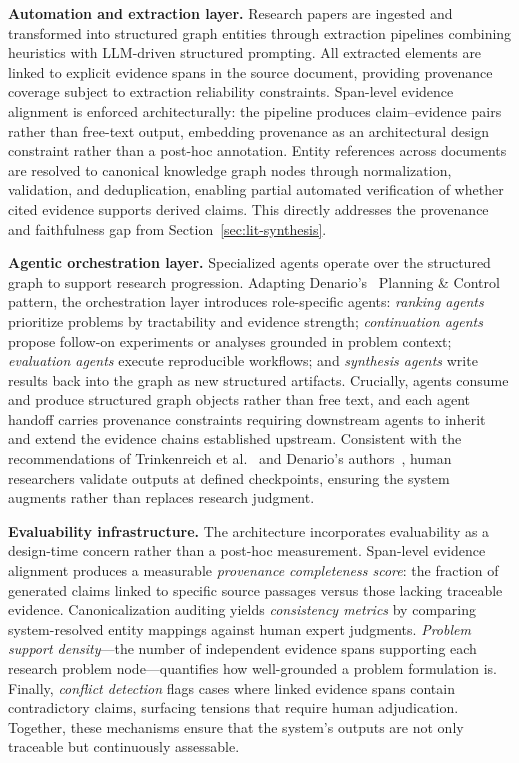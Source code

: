 \textbf{Automation and extraction layer.} Research papers are ingested and transformed into structured graph entities through extraction pipelines combining heuristics with LLM-driven structured prompting. All extracted elements are linked to explicit evidence spans in the source document, providing provenance coverage subject to extraction reliability constraints. Span-level evidence alignment is enforced architecturally: the pipeline produces claim--evidence pairs rather than free-text output, embedding provenance as an architectural design constraint rather than a post-hoc annotation. Entity references across documents are resolved to canonical knowledge graph nodes through normalization, validation, and deduplication, enabling partial automated verification of whether cited evidence supports derived claims. This directly addresses the provenance and faithfulness gap from Section~\ref{sec:lit-synthesis}.

\textbf{Agentic orchestration layer.} Specialized agents operate over the structured graph to support research progression. Adapting Denario's~\cite{villaescusa2025denario} Planning \& Control pattern, the orchestration layer introduces role-specific agents: \emph{ranking agents} prioritize problems by tractability and evidence strength; \emph{continuation agents} propose follow-on experiments or analyses grounded in problem context; \emph{evaluation agents} execute reproducible workflows; and \emph{synthesis agents} write results back into the graph as new structured artifacts. Crucially, agents consume and produce structured graph objects rather than free text, and each agent handoff carries provenance constraints requiring downstream agents to inherit and extend the evidence chains established upstream. Consistent with the recommendations of Trinkenreich et al.~\cite{trinkenreich2025train} and Denario's authors~\cite{villaescusa2025denario}, human researchers validate outputs at defined checkpoints, ensuring the system augments rather than replaces research judgment.

\textbf{Evaluability infrastructure.} The architecture incorporates evaluability as a design-time concern rather than a post-hoc measurement. Span-level evidence alignment produces a measurable \emph{provenance completeness score}: the fraction of generated claims linked to specific source passages versus those lacking traceable evidence. Canonicalization auditing yields \emph{consistency metrics} by comparing system-resolved entity mappings against human expert judgments. \emph{Problem support density}---the number of independent evidence spans supporting each research problem node---quantifies how well-grounded a problem formulation is. Finally, \emph{conflict detection} flags cases where linked evidence spans contain contradictory claims, surfacing tensions that require human adjudication. Together, these mechanisms ensure that the system's outputs are not only traceable but continuously assessable.

